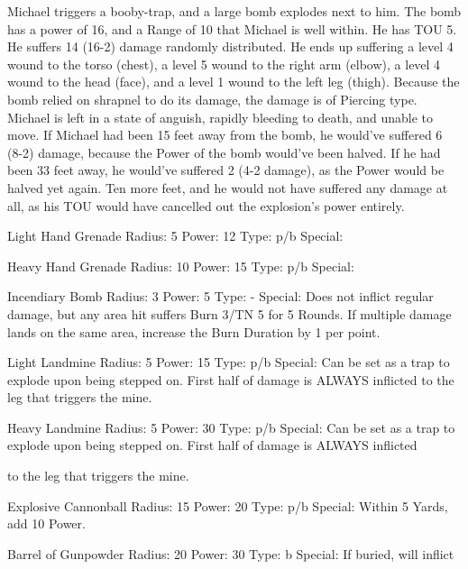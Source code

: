\documentclass[oneside,11pt,english]{book}
\begin{document}
 

Michael triggers a booby-trap, and a large bomb explodes next to him. The bomb has a power of 16, and 
a Range of 10 that Michael is well within. He has TOU 5. He suffers 14 (16-2) damage randomly 
distributed. He ends up suffering a level 4 wound to the torso (chest), a level 5 wound to the right arm 
(elbow), a level 4 wound to the head (face), and a level 1 wound to the left leg (thigh). Because the bomb 
relied on shrapnel to do its damage, the damage is of Piercing type. 
Michael is left in a state of anguish, rapidly bleeding to death, and unable to move. 
If Michael had been 15 feet away from the bomb, he would've suffered 6 (8-2) damage, because the 
Power of the bomb would've been halved. If he had been 33 feet away, he would've suffered 2 (4-2 
damage), as the Power would be halved yet again. Ten more feet, and he would not have suffered any 
damage at all, as his TOU would have cancelled out the explosion's power entirely. 

 

Light Hand Grenade 
Radius: 5 
Power: 12 
Type: p/b 
Special: 

 

Heavy Hand Grenade 
Radius: 10 
Power: 15 
Type: p/b 
Special: 

 

Incendiary Bomb 
Radius: 3 
Power: 5 
Type: - 
Special: Does not inflict regular damage, but any area hit suffers Burn 3/TN 5 for 5 Rounds. If multiple 
damage lands on the same area, increase the Burn Duration by 1 per point. 

 

Light Landmine 
Radius: 5 
Power: 15 
Type: p/b 
Special: Can be set as a trap to explode upon being stepped on. First half of damage is ALWAYS inflicted 
to the leg that triggers the mine. 

 

Heavy Landmine 
Radius: 5 
Power: 30 
Type: p/b 
Special: Can be set as a trap to explode upon being stepped on. First half of damage is ALWAYS inflicted 


to the leg that triggers the mine. 

 

Explosive Cannonball 
Radius: 15 
Power: 20 
Type: p/b 
Special: Within 5 Yards, add 10 Power. 

 

Barrel of Gunpowder 
Radius: 20 
Power: 30 
Type: b 
Special: If buried, will inflict 

 
\end{document}
